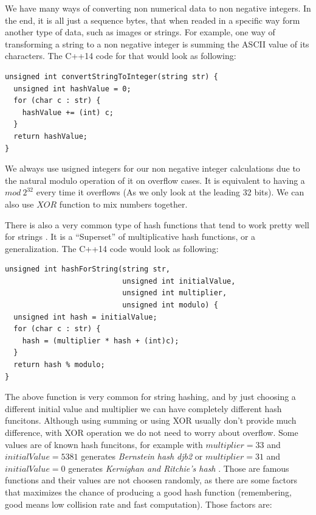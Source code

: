 We have many ways of converting non numerical data to non negative integers. In the end, it is all just a sequence bytes, that when readed in a specific way form another type of data, such as images or strings. For example, one way of transforming a string to a non negative integer is summing the ASCII value of its characters. The C++14 code for that would look as following:

\begin{lstlisting}
unsigned int convertStringToInteger(string str) {
  unsigned int hashValue = 0;
  for (char c : str) {
    hashValue += (int) c;
  }
  return hashValue;
}
\end{lstlisting}

We always use usigned integers for our non negative integer calculations due to the natural modulo operation of it on overflow cases. It is equivalent to having a \( mod \ 2^{32} \) every time it overflows (As we only look at the leading 32 bits). We can also use \( XOR \) function to mix numbers together. 

There is also a very common type of hash functions that tend to work pretty well for strings \cite{DragonHashFunc}. It is a ``Superset'' of multiplicative hash functions, or a generalization. The C++14 code would look as following:

\begin{lstlisting}
unsigned int hashForString(string str,
                           unsigned int initialValue,
                           unsigned int multiplier,
                           unsigned int modulo) {
  unsigned int hash = initialValue;
  for (char c : str) {
    hash = (multiplier * hash + (int)c);
  }
  return hash % modulo;
}
\end{lstlisting}

The above function is very common for string hashing, and by just choosing a different initial value and multiplier we can have completely different hash funcitons. Although using summing or using XOR usually don't provide much difference, with XOR operation we do not need to worry about overflow. Some values are of known hash funcitons, for example with \( multiplier = 33 \) and \( initialValue = 5381 \) generates \textit{Bernstein hash djb2} \cite{BernsteinHash} or \( multiplier = 31 \) and \( initialValue = 0 \) generates \textit{Kernighan and Ritchie's hash} \cite{KernighanHash}. Those are famous functions and their values are not choosen randomly, as there are some factors that maximizes the chance of producing a good hash function (remembering, good means low collision rate and fast computation). Those factors are:


